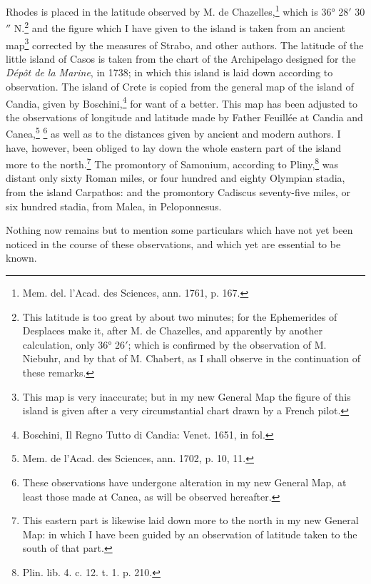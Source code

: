 \documentclass[a4paper, 11pt, oneside, polutonikogreek, english]{article}
\begin{document}
Rhodes is placed in the latitude observed by M. de Chazelles,\footnote{Mem. del. l'Acad. des Sciences, ann. 1761, p. 167.} which is 36° 28$'$ 30$''$ N.\footnote{This latitude is too great by about two minutes; for the Ephemerides of Desplaces make it, after M. de Chazelles, and apparently by another calculation, only 36° 26$'$; which is confirmed by the observation of M. Niebuhr, and by that of M. Chabert, as I shall observe in the continuation of these remarks.} and the figure which I have given to the island is taken from an ancient map\footnote{This map is very inaccurate; but in my new General Map the figure of this island is given after a very circumstantial chart drawn by a French pilot.} corrected by the measures of Strabo, and other authors. The latitude of the little island of Casos is taken from the chart of the Archipelago designed for the \emph{Dépôt de la Marine}, in 1738; in which this island is laid down according to observation. The island of Crete is copied from the general map of the island of Candia, given by Boschini,\footnote{Boschini, Il Regno Tutto di Candia: Venet. 1651, in fol.} for want of a better. This map has been adjusted to the observations of longitude and latitude made by Father Feuillée at Candia and Canea,\footnote{Mem. de l'Acad. des Sciences, ann. 1702, p. 10, 11.} \footnote{These observations have undergone alteration in my new General Map, at least those made at Canea, as will be observed hereafter.} as well as to the distances given by ancient and modern authors. I have, however, been obliged to lay down the whole eastern part of the island more to the north.\footnote{This eastern part is likewise laid down more to the north in my new General Map: in which I have been guided by an observation of latitude taken to the south of that part.} The promontory of Samonium, according to Pliny,\footnote{Plin. lib. 4. c. 12. t. 1. p. 210.} was distant only sixty Roman miles, or four hundred and eighty Olympian stadia, from the island Carpathos: and the promontory Cadiscus seventy-five miles, or six hundred stadia, from Malea, in Peloponnesus.

Nothing now remains but to mention some particulars which have not yet been noticed in the course of these observations, and which yet are essential to be known.
\end{document}
